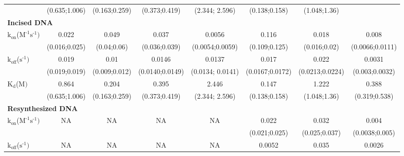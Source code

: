 \begin{table}[H]
\begin{tabular}{lccccccc}
		& (0.635;1.006)     & (0.163;0.259)             & (0.373;0.419)		&(2.344; 2.596)&(0.138;0.158)     &  (1.048;1.36)  &   \\
		\multicolumn{8}{l}{\textbf{Incised DNA}} \\
		$\text{k}_{\text{on}}$({\textmu}$\text{M}^{\text{-1}}\text{s}^{\text{-1}})$    & 0.022                     & 0.049                   & 0.037                 &  0.0056             & 0.116                   &0.018                    & 0.008    \\
		& (0.016;0.025)     & (0.04;0.06)   					&(0.036;0.039) 		 & (0.0054;0.0059)&(0.109;0.125)    &(0.016;0.02)    	& (0.0066;0.0111)    \\
		$\text{k}_{\text{off}}$($\text{s}^{\text{-1}})$                                              & 0.019                     & 0.01                   & 0.0146               & 0.0137                & 0.017                   & 0.022                 &0.0031     \\
		& (0.019;0.019)     & (0.009;0.012)             & (0.0140;0.0149)&(0.0134; 0.0141)&(0.0167;0.0172)     &  (0.0213;0.0224)    & (0.003;0.0032)  \\
		$\text{K}_{\text{d}}$({\textmu}$\text{M})$                                                   & 0.864                     & 0.204                   & 0.395                 &2.446                 &0.147                    &1.222                   &0.388    \\
		& (0.635;1.006)     & (0.163;0.259)             & (0.373;0.419)		&(2.344; 2.596)&(0.138;0.158)     &  (1.048;1.36)  					& (0.319;0.538)   \\
		\multicolumn{8}{l}{\textbf{Resynthesized DNA}} \\
		$\text{k}_{\text{on}}$({\textmu}$\text{M}^{\text{-1}}\text{s}^{\text{-1}})$    & NA                          & NA                        & NA                      &  NA                    & 0.022                   &0.032                    &0.004    \\
		&                               &                             &                            &                          &(0.021;0.025)    &(0.025;0.037)    & (0.0038;0.005)    \\
		$\text{k}_{\text{off}}$($\text{s}^{\text{-1}})$                                             & NA                          &NA                          & NA                      & NA                     & 0.0052                  & 0.035                   &0.0026     \\

\end{tabular}
\end{table}
